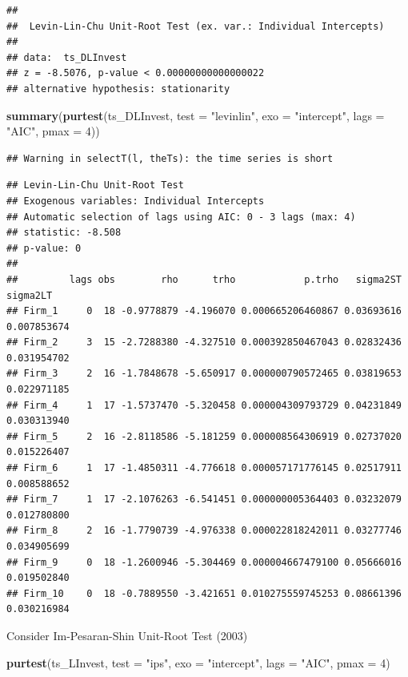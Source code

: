 \documentclass[
]{book}
\newenvironment{Shaded}{\begin{snugshade}}{\end{snugshade}}
\newcommand{\AttributeTok}[1]{\textcolor[rgb]{0.13,0.29,0.53}{#1}}
\newcommand{\DecValTok}[1]{\textcolor[rgb]{0.00,0.00,0.81}{#1}}
\newcommand{\FunctionTok}[1]{\textcolor[rgb]{0.13,0.29,0.53}{\textbf{#1}}}
\newcommand{\NormalTok}[1]{#1}
\newcommand{\StringTok}[1]{\textcolor[rgb]{0.31,0.60,0.02}{#1}}
\begin{document}
\begin{verbatim}
## 
##  Levin-Lin-Chu Unit-Root Test (ex. var.: Individual Intercepts)
## 
## data:  ts_DLInvest
## z = -8.5076, p-value < 0.00000000000000022
## alternative hypothesis: stationarity
\end{verbatim}

\begin{Shaded}
\begin{Highlighting}[]
\FunctionTok{summary}\NormalTok{(}\FunctionTok{purtest}\NormalTok{(ts\_DLInvest, }\AttributeTok{test =} \StringTok{"levinlin"}\NormalTok{, }\AttributeTok{exo =} \StringTok{"intercept"}\NormalTok{, }
        \AttributeTok{lags =} \StringTok{"AIC"}\NormalTok{, }\AttributeTok{pmax =} \DecValTok{4}\NormalTok{))}
\end{Highlighting}
\end{Shaded}

\begin{verbatim}
## Warning in selectT(l, theTs): the time series is short
\end{verbatim}

\begin{verbatim}
## Levin-Lin-Chu Unit-Root Test 
## Exogenous variables: Individual Intercepts 
## Automatic selection of lags using AIC: 0 - 3 lags (max: 4)
## statistic: -8.508 
## p-value: 0 
## 
##         lags obs        rho      trho            p.trho   sigma2ST    sigma2LT
## Firm_1     0  18 -0.9778879 -4.196070 0.000665206460867 0.03693616 0.007853674
## Firm_2     3  15 -2.7288380 -4.327510 0.000392850467043 0.02832436 0.031954702
## Firm_3     2  16 -1.7848678 -5.650917 0.000000790572465 0.03819653 0.022971185
## Firm_4     1  17 -1.5737470 -5.320458 0.000004309793729 0.04231849 0.030313940
## Firm_5     2  16 -2.8118586 -5.181259 0.000008564306919 0.02737020 0.015226407
## Firm_6     1  17 -1.4850311 -4.776618 0.000057171776145 0.02517911 0.008588652
## Firm_7     1  17 -2.1076263 -6.541451 0.000000005364403 0.03232079 0.012780800
## Firm_8     2  16 -1.7790739 -4.976338 0.000022818242011 0.03277746 0.034905699
## Firm_9     0  18 -1.2600946 -5.304469 0.000004667479100 0.05666016 0.019502840
## Firm_10    0  18 -0.7889550 -3.421651 0.010275559745253 0.08661396 0.030216984
\end{verbatim}

Consider Im-Pesaran-Shin Unit-Root Test (2003)

\begin{Shaded}
\begin{Highlighting}[]
\FunctionTok{purtest}\NormalTok{(ts\_LInvest, }\AttributeTok{test =} \StringTok{"ips"}\NormalTok{, }\AttributeTok{exo =} \StringTok{"intercept"}\NormalTok{, }
        \AttributeTok{lags =} \StringTok{"AIC"}\NormalTok{, }\AttributeTok{pmax =} \DecValTok{4}\NormalTok{)}
\end{Highlighting}
\end{Shaded}
\end{document}
